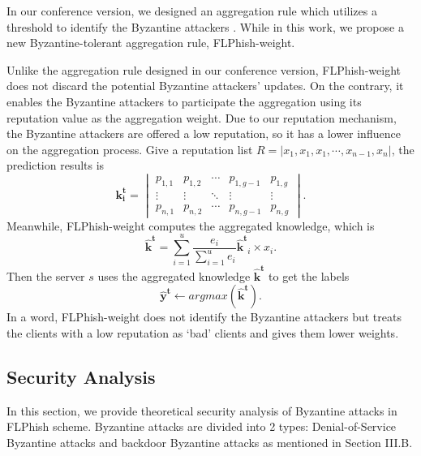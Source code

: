 \documentclass[journal]{IEEEtran}
\begin{document}
\par In our conference version, we designed an aggregation rule which utilizes a threshold to identify the Byzantine attackers \cite{li2021flphish}. While in this work, we propose a new Byzantine-tolerant aggregation rule, FLPhish-weight.
\par Unlike the aggregation rule designed in our conference version, FLPhish-weight does not discard the potential Byzantine attackers' updates. On the contrary, it enables the Byzantine attackers to participate the aggregation using its reputation value as the aggregation weight. Due to our reputation mechanism, the Byzantine attackers are offered a low reputation, so it has a lower influence on the aggregation process.
Give a reputation list $R=\left | x_{1},x_{1},x_{1},\cdots ,x_{n-1},x_{n} \right |$, the prediction results is 
\begin{equation}
  \mathbf{k_i^t}=\begin{vmatrix}
    p_{1,1} & p_{1,2} & \cdots  & p_{1,g-1} & p_{1,g}\\ 
    \vdots  & \vdots & \ddots  & \vdots & \vdots\\ 
    p_{n,1} & p_{n,2} & \cdots  & p_{n,g-1} & p_{n,g}
    \end{vmatrix}.
\end{equation}
Meanwhile, FLPhish-weight computes the aggregated knowledge, which is
  \begin{equation}
  \mathbf{\hat{k}^t}=\sum_{i=1}^{u}\frac{e_i}{\sum_{i=1}^{u}e_i}\mathbf{\hat{k}^t}_i\times x_{i}.
\end{equation}
Then the server $s$ uses the aggregated knowledge $\mathbf{\hat{k}^t}$ to get the labels
\begin{equation}
  \mathbf{\hat{y}^t}\gets argmax(\mathbf{\hat{k}^t}).
\end{equation} 
In a word, FLPhish-weight does not identify the Byzantine attackers but treats the clients with a low reputation as `bad' clients and gives them lower weights.


\subsection{Security Analysis}
\par In this section, we provide theoretical security analysis of Byzantine attacks in FLPhish scheme. Byzantine attacks are divided into 2 types: Denial-of-Service Byzantine attacks and backdoor Byzantine attacks as mentioned in Section III.B.
\end{document}

